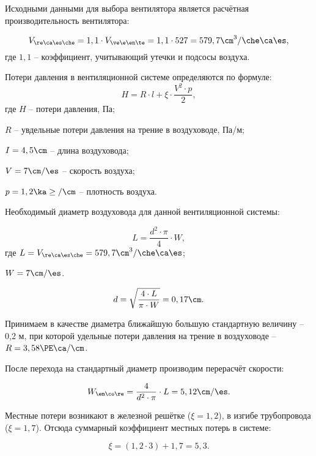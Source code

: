Исходными данными для выбора вентилятора является расчётная производительность вентилятора:

\begin{equation*}
	V_{\re\ca\es\che} = 1,1 \cdot V_{\ve\e\en\te} = 1,1 \cdot 527 = 579,7 \cm^3 / \che\ca\es,
\end{equation*}
где $1,1$ -- коэффициент, учитывающий утечки и подсосы воздуха.

Потери давления в вентиляционной системе определяются по формуле:
\begin{equation*}
	H = R \cdot l + \xi \cdot \frac{V^2 \cdot p}{2},
\end{equation*}
где $H$ -- потери давления, Па;

$R$ -- увдельные потери давления на трение в воздуховоде, Па/м;

$I = 4,5 \cm$ -- длина воздуховода;

$V = 7 \cm / \es$ -- скорость воздуха;

$p = 1,2 \ka\ge / \cm$ -- плотность воздуха.

Необходимый диаметр воздуховода для данной вентиляционной системы:

\begin{equation*}
	L = \frac{d^2 \cdot \pi}{4} \cdot W,
\end{equation*}
где $L = V_{\re\ca\es\che} = 579,7 \cm^3 / \che\ca\es$;

$W = 7 \cm / \es$.

\begin{equation*}
	d = \sqrt{ \frac{4 \cdot L}{\pi \cdot W}} = 0,17 \cm.
\end{equation*}

Принимаем в качестве диаметра ближайшую большую стандартную величину -- 0,2 м, при которой удельные потери давления на трение в воздуховоде -- $R = 3,58 \PE\ca / \cm$.

После перехода на стандартный диаметр производим перерасчёт скорости:

\begin{equation*}
	W_{\en\co\re} = \frac{4}{d^2 \cdot \pi} \cdot L = 5,12 \cm / \es.
\end{equation*}

Местные потери возникают в железной решётке ($\xi = 1,2$), в изгибе трубопровода ($\xi = 1,7$). Отсюда суммарный коэффициент местных потерь в системе:

\begin{equation*}
	\xi = (1,2 \cdot 3) + 1,7 = 5,3.
\end{equation*}

